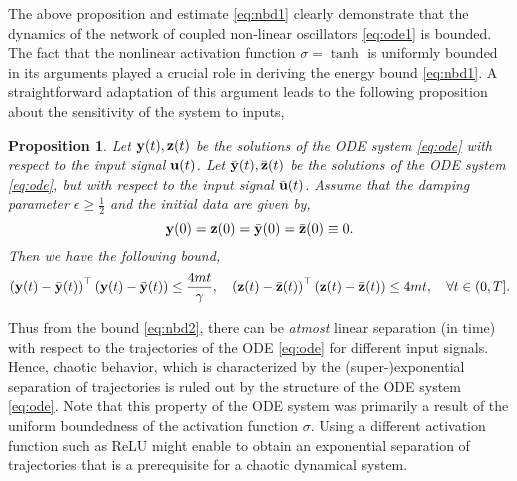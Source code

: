 \documentclass{article} \usepackage{iclr2021_conference,times}
\newtheorem{proposition}[theorem]{Proposition}
\newcommand{\by}{{\bf y}}
\newcommand{\bz}{{\bf z}}
\newcommand{\bu}{{\bf u}}
\begin{document}
The above proposition and estimate \eqref{eq:nbd1} clearly demonstrate that the dynamics of the network of coupled non-linear oscillators \eqref{eq:ode1} is bounded. The fact that the nonlinear activation function $\sigma = \tanh$ is uniformly bounded in its arguments played a crucial role in deriving the energy bound \eqref{eq:nbd1}. A straightforward adaptation of this argument leads to the following proposition about the sensitivity of the system to inputs,
\begin{proposition}
\label{prop:n2}
Let $\by(t),\bz(t)$ be the solutions of the ODE system \eqref{eq:ode} with respect to the input signal $\bu(t)$. Let  $\bar{\by}(t),
\bar{\bz}(t)$ be the solutions of the ODE system \eqref{eq:ode}, but with respect to the input signal $\bar{\bu}(t)$. Assume that the damping parameter $\epsilon \geq \frac{1}{2}$ and the initial data are given by,
$$
\by(0) = \bz(0) = \bar{\by}(0) = \bar{\bz}(0) \equiv 0.
$$
Then we have the following bound,
\begin{equation}
\label{eq:nbd2}
\left(\by(t)-\bar{\by}(t)\right)^{\top}\left(\by(t)-\bar{\by}(t)\right) \leq \frac{4mt}{\gamma}, \quad \left(\bz(t)-\bar{\bz}(t)\right)^{\top}\left(\bz(t)-\bar{\bz}(t)\right) \leq 4mt, \quad \forall t \in (0,T].
\end{equation}
\end{proposition}
Thus from the bound \eqref{eq:nbd2}, there can be \emph{atmost} linear separation (in time) with respect to the trajectories of the ODE \eqref{eq:ode} for different input signals. Hence, chaotic behavior, which is characterized by the (super-)exponential separation of trajectories is ruled out by the structure of the ODE system \eqref{eq:ode}. Note that this property of the ODE system was primarily a result of the uniform boundedness of the activation function $\sigma$. Using a different activation function such as ReLU might enable to obtain an exponential separation of trajectories that is a prerequisite for a chaotic dynamical system.  
\end{document}
